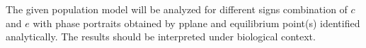 The given population model will be analyzed for different signs combination of $c$ and $e$ with phase portraits obtained by pplane and equilibrium point(s) identified analytically. The results should be interpreted under biological context. 